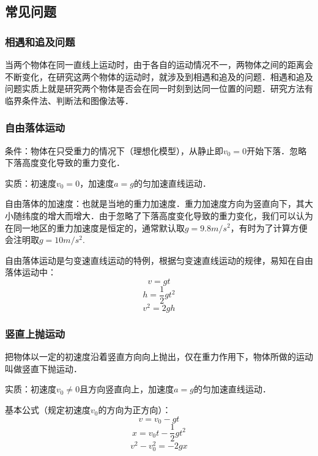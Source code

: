 \subsection{常见问题}
\subsubsection{相遇和追及问题}
当两个物体在同一直线上运动时，由于各自的运动情况不一，两物体之间的距离会不断变化，在研究这两个物体的运动时，就涉及到相遇和追及的问题．相遇和追及问题实质上就是研究两个物体是否会在同一时刻到达同一位置的问题．研究方法有临界条件法、判断法和图像法等．

\subsubsection{自由落体运动}
条件：物体在只受重力的情况下（理想化模型），从静止即$v_0=0$开始下落．忽略下落高度变化导致的重力变化．

实质：初速度$v_0=0$，加速度$a=g$的匀加速直线运动．

自由落体的加速度：也就是当地的重力加速度．重力加速度方向为竖直向下，其大小随纬度的增大而增大．由于忽略了下落高度变化导致的重力变化，我们可以认为在同一地区的重力加速度是恒定的，通常默认取$g=9.8m/s^2$，有时为了计算方便会注明取$g=10m/s^2$.

自由落体运动是匀变速直线运动的特例，根据匀变速直线运动的规律，易知在自由落体运动中：
\begin{equation}
v=gt
\end{equation}
\begin{equation}
h=\frac12gt^2
\end{equation}
\begin{equation}
v^2=2gh
\end{equation}

\subsubsection{竖直上抛运动}
把物体以一定的初速度沿着竖直方向向上抛出，仅在重力作用下，物体所做的运动叫做竖直下抛运动．

实质：初速度$v_0\neq0$且方向竖直向上，加速度$a=g$的匀加速直线运动．

基本公式（规定初速度$v_0$的方向为正方向）：
\begin{equation}
v=v_0-gt
\end{equation}
\begin{equation}
x=v_0t-\frac12gt^2
\end{equation}
\begin{equation}
v^2-v_0^2=-2gx
\end{equation}

